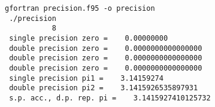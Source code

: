 \begin{Verbatim}[frame=lines,label=precision - commands and output]
 gfortran precision.f95 -o precision
 ./precision
           8
 single precision zero =    0.00000000    
 double precision zero =    0.0000000000000000     
 double precision zero =    0.0000000000000000     
 double precision zero =    0.0000000000000000     
 single precision pi1 =    3.14159274    
 double precision pi2 =    3.1415926535897931     
 s.p. acc., d.p. rep. pi =    3.1415927410125732     
\end{Verbatim}
